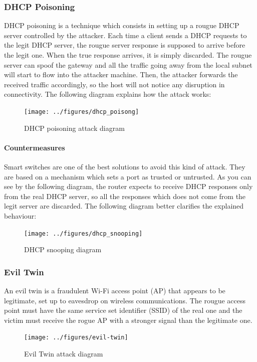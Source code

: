 \documentclass{article}
\begin{document}
\subsubsection{DHCP Poisoning}
DHCP poisoning is a technique which consists in setting up a rougue DHCP server controlled by the attacker. Each time a client sends a DHCP requests to the legit DHCP server, the rougue server response is supposed to arrive before the legit one. When the true response arrives, it is simply discarded. The rougue server can spoof the gateway and all the traffic going away from the local subnet will start to flow into the attacker machine. Then, the attacker forwards the received traffic accordingly, so the host will not notice any disruption in connectivity. The following diagram explains how the attack works:
\begin{figure}[h]
\center
\texttt{[image: ../figures/dhcp\_poisong]}
\caption{DHCP poisoning attack diagram}
\end{figure}
\paragraph{Countermeasures}
Smart switches are one of the best solutions to avoid this kind of attack. They are based on a mechanism which sets a port as trusted or untrusted. As you can see by the following diagram, the router expects to receive DHCP responses only from the real DHCP server, so all the responses which does not come from the legit server are discarded. The following diagram better clarifies the explained behaviour: 

\begin{figure}[h]
\center
\texttt{[image: ../figures/dhcp\_snooping]}
\caption{DHCP snooping diagram}
\end{figure}

\subsubsection{Evil Twin}
An evil twin is a fraudulent Wi-Fi access point (AP) that appears to be legitimate, set up to eavesdrop on wireless communications. The rougue access point must have the same service set identifier (SSID) of the real one and the victim must receive the rogue AP with a stronger signal than the legitimate one. 

\begin{figure}[h]
  \center
  \texttt{[image: ../figures/evil-twin]}
  \caption{Evil Twin attack diagram}
\end{figure}
\end{document}
